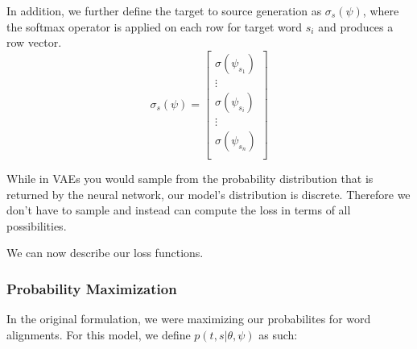 \documentclass[twoside,twocolumn]{article}
\begin{document}

In addition, we further define the target to source generation as $\sigma_s(\psi)$, where the softmax operator is applied on each row for target word $s_i$ and produces a row vector.
\begin{equation}
  \sigma_s(\psi) = \left[
    \begin{matrix}
      \sigma(\psi_{s_1})  \\
      \vdots \\
      \sigma(\psi_{s_i})  \\
      \vdots \\
      \sigma(\psi_{s_n})  \\
    \end{matrix}
\right]
\end{equation}

While in VAEs you would sample from the probability distribution that is returned by the neural network, our model's distribution is discrete. Therefore we don’t have to sample and instead can compute the loss in terms of all possibilities.


We can now describe our loss functions.

\subsubsection{Probability Maximization}
In the original formulation, we were maximizing our probabilites for word alignments. For this model, we define $p(t, s | \theta, \psi)$ as such:
\end{document}
